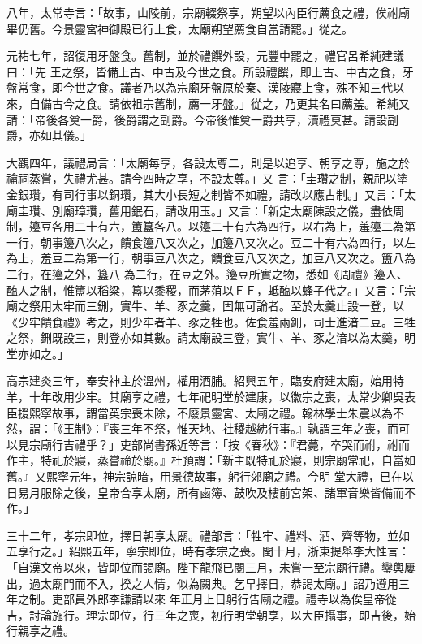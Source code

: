 \begin{pinyinscope}
 八年，太常寺言：「故事，山陵前，宗廟輟祭享，朔望以內臣行薦食之禮，俟祔廟畢仍舊。今景靈宮神御殿已行上食，太廟朔望薦食自當請罷。」從之。



 元祐七年，詔復用牙盤食。舊制，並於禮饌外設，元豐中罷之，禮官呂希純建議曰：「先
 王之祭，皆備上古、中古及今世之食。所設禮饌，即上古、中古之食，牙盤常食，即今世之食。議者乃以為宗廟牙盤原於秦、漢陵寢上食，殊不知三代以來，自備古今之食。請依祖宗舊制，薦一牙盤。」從之，乃更其名曰薦羞。希純又請：「帝後各奠一爵，後爵謂之副爵。今帝後惟奠一爵共享，瀆禮莫甚。請設副爵，亦如其儀。」



 大觀四年，議禮局言：「太廟每享，各設太尊二，則是以追享、朝享之尊，施之於禴祠蒸嘗，失禮尤甚。請今四時之享，不設太尊。」又
 言：「圭瓚之制，親祀以塗金銀瓚，有司行事以銅瓚，其大小長短之制皆不如禮，請改以應古制。」又言：「太廟圭瓚、別廟璋瓚，舊用鈱石，請改用玉。」又言：「新定太廟陳設之儀，盡依周制，籩豆各用二十有六，簠簋各八。以籩二十有六為四行，以右為上，羞籩二為第一行，朝事籩八次之，饋食籩八又次之，加籩八又次之。豆二十有六為四行，以左為上，羞豆二為第一行，朝事豆八次之，饋食豆八又次之，加豆八又次之。簠八為二行，在籩之外，簋八
 為二行，在豆之外。籩豆所實之物，悉如《周禮》籩人、醢人之制，惟簠以稻粱，簋以黍稷，而茅菹以ＦＦ，蚳醢以蜂子代之。」又言：「宗廟之祭用太牢而三鉶，實牛、羊、豕之羹，固無可論者。至於太羹止設一登，以《少牢饋食禮》考之，則少牢者羊、豕之牲也。佐食羞兩鉶，司士進湆二豆。三牲之祭，鉶既設三，則登亦如其數。請太廟設三登，實牛、羊、豕之湆以為太羹，明堂亦如之。」



 高宗建炎三年，奉安神主於溫州，權用酒脯。紹興五年，臨安府建太廟，始用特
 羊，十年改用少牢。其廟享之禮，七年祀明堂於建康，以徽宗之喪，太常少卿吳表臣援熙寧故事，謂當英宗喪未除，不廢景靈宮、太廟之禮。翰林學士朱震以為不然，謂：「《王制》：『喪三年不祭，惟天地、社稷越紼行事。』孰謂三年之喪，而可以見宗廟行吉禮乎？」吏部尚書孫近等言：「按《春秋》：『君薨，卒哭而祔，祔而作主，特祀於寢，蒸嘗禘於廟。』杜預謂：「新主既特祀於寢，則宗廟常祀，自當如舊。』又熙寧元年，神宗諒暗，用景德故事，躬行郊廟之禮。今明
 堂大禮，已在以日易月服除之後，皇帝合享太廟，所有鹵簿、鼓吹及樓前宮架、諸軍音樂皆備而不作。」



 三十二年，孝宗即位，擇日朝享太廟。禮部言：「牲牢、禮料、酒、齊等物，並如五享行之。」紹熙五年，寧宗即位，時有孝宗之喪。閏十月，浙東提舉李大性言：「自漢文帝以來，皆即位而謁廟。陛下龍飛已閱三月，未嘗一至宗廟行禮。鑾輿屢出，過太廟門而不入，揆之人情，似為闕典。乞早擇日，恭謁太廟。」詔乃遵用三年之制。吏部員外郎李謙請以來
 年正月上日躬行告廟之禮。禮寺以為俟皇帝從吉，討論施行。理宗即位，行三年之喪，初行明堂朝享，以大臣攝事，即吉後，始行親享之禮。




\end{pinyinscope}
